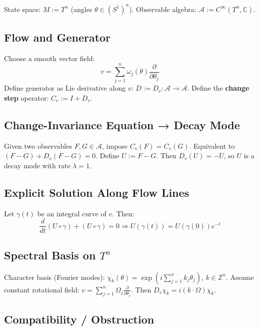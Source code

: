 \documentclass[12pt, oneside]{article}
\begin{document}
State space: $M := T^n$ (angles $\theta \in (S^1)^n$). Observable algebra: $\mathcal{A} := C^\infty(T^n, \mathbb{C})$.

\subsection{Flow and Generator}

Choose a smooth vector field:
\begin{equation}
v = \sum_{j=1}^n \omega_j(\theta) \frac{\partial}{\partial \theta_j}
\end{equation}
Define generator as Lie derivative along $v$: $D := D_v: \mathcal{A} \rightarrow \mathcal{A}$. Define the \textbf{change step} operator: $C_v := I + D_v$.

\subsection{Change-Invariance Equation → Decay Mode}

Given two observables $F, G \in \mathcal{A}$, impose $C_v(F) = C_v(G)$. Equivalent to $(F-G) + D_v(F-G) = 0$. Define $U := F - G$. Then $D_v(U) = -U$, so $U$ is a decay mode with rate $\lambda = 1$.

\subsection{Explicit Solution Along Flow Lines}

Let $\gamma(t)$ be an integral curve of $v$. Then:
\begin{equation}
\frac{d}{dt} (U \circ \gamma) + (U \circ \gamma) = 0 \Rightarrow U(\gamma(t)) = U(\gamma(0)) e^{-t}
\end{equation}

\subsection{Spectral Basis on $T^n$}

Character basis (Fourier modes): $\chi_k(\theta) = \exp(i\sum_{j=1}^n k_j \theta_j)$, $k \in \mathbb{Z}^n$. Assume constant rotational field: $v = \sum_{j=1}^n \Omega_j \frac{\partial}{\partial \theta_j}$. Then $D_v \chi_k = i(k \cdot \Omega) \chi_k$.

\subsection{Compatibility / Obstruction}
\end{document}

